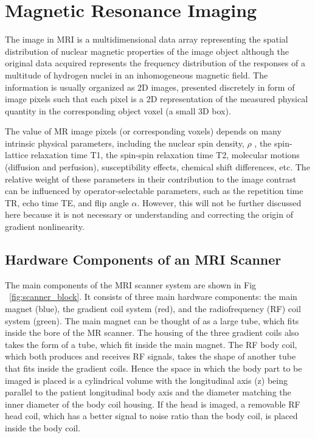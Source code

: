 \section{Magnetic Resonance Imaging}
The image in MRI is a multidimensional data array representing the spatial distribution of nuclear 
magnetic properties of the image object although the original data acquired represents the frequency 
distribution of the responses of a multitude of hydrogen nuclei in an inhomogeneous magnetic field. The 
information is usually organized as 2D images, presented discretely in form of image pixels such that 
each pixel is a 2D representation of the measured physical quantity in the corresponding object voxel 
(a small 3D box).

The value of MR image pixels (or corresponding voxels) depends on many intrinsic physical parameters, 
including the nuclear spin density, $\rho$ , the spin-lattice relaxation time T1, the spin-spin 
relaxation time T2, molecular motions (diffusion and perfusion), susceptibility effects, chemical shift 
differences, etc. The relative weight of these parameters in their contribution to the image contrast 
can be influenced by operator-selectable parameters, such as the repetition time TR, echo time TE, and 
flip angle $\alpha$. However, this will not be further discussed here because it is not necessary or 
understanding and correcting the origin of gradient nonlinearity.

\subsection{Hardware Components of an MRI Scanner}

The main components of the MRI scanner system are shown in Fig ~\ref{fig:scanner_block}. 
It consists of three main hardware 
components: the main magnet (blue), the gradient coil system (red), and the radiofrequency (RF) coil 
system (green). The main magnet can be thought of as a large tube, which fits inside the bore of the MR 
scanner. The housing of the three gradient coils also takes the form of a tube, which fit inside the 
main magnet. The RF body coil, which both produces and receives RF signals, takes the shape of another 
tube that fits inside the gradient coils. Hence the space in which the body part to be imaged is placed 
is a cylindrical volume with the longitudinal axis (z) being parallel to the patient longitudinal body 
axis and the diameter matching the inner diameter of the body coil housing. If the head is imaged, a 
removable RF head coil, which has a better signal to noise ratio than the body coil, is placed inside 
the body coil.

